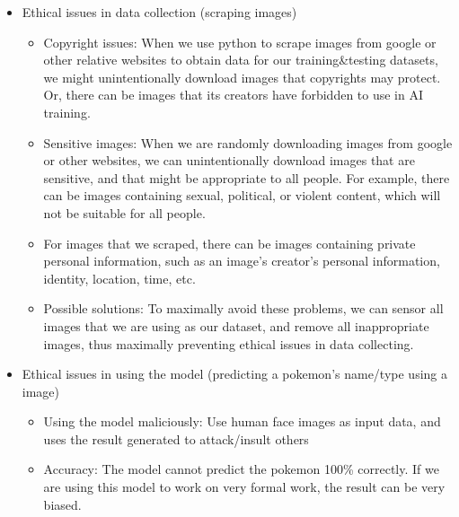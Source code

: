 \documentclass{article} %
\begin{document}
\begin{itemize}
  \item Ethical issues in data collection (scraping images)
  \begin{itemize}
    \item Copyright issues: When we use python to scrape images from google or other relative websites to obtain data for our training\&testing datasets, we might unintentionally download images that copyrights may protect. Or, there can be images that its creators have forbidden to use in AI training.
    \item Sensitive images: When we are randomly downloading images from google or other websites, we can unintentionally download images that are sensitive, and that might be appropriate to all people. For example, there can be images containing sexual, political, or violent content, which will not be suitable for all people.
    \item For images that we scraped, there can be images containing private personal information, such as an image’s creator’s personal information, identity, location, time, etc. 
    \item Possible solutions: To maximally avoid these problems, we can sensor all images that we are using as our dataset, and remove all inappropriate images, thus maximally preventing ethical issues in data collecting.
  \end{itemize}
  \item Ethical issues in using the model (predicting a pokemon’s name/type using a image)
  \begin{itemize}
    \item Using the model maliciously: Use human face images as input data, and uses the result generated to attack/insult others
    \item Accuracy: The model cannot predict the pokemon 100\% correctly. If we are using this model to work on very formal work, the result can be very biased.
  \end{itemize}
\end{itemize}
\end{document}

